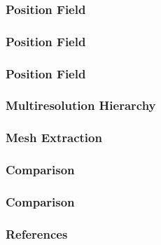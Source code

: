 \documentclass[aspectratio=43,sanserif,professionalfonts]{beamer}
\begin{document}
\begin{frame}
	\frametitle{Position Field}
\end{frame}

\begin{frame}
	\frametitle{Position Field}
\end{frame}

\begin{frame}
	\frametitle{Position Field}
\end{frame}

\begin{frame}
	\frametitle{Multiresolution Hierarchy}
\end{frame}

\begin{frame}
	\frametitle{Mesh Extraction}
\end{frame}

\begin{frame}
	\frametitle{Comparison}
\end{frame}

\begin{frame}
	\frametitle{Comparison}
\end{frame}

\begin{frame}[allowframebreaks]
	\frametitle{References}
	\nocite{*}
	
	
\end{frame}
\end{document}
